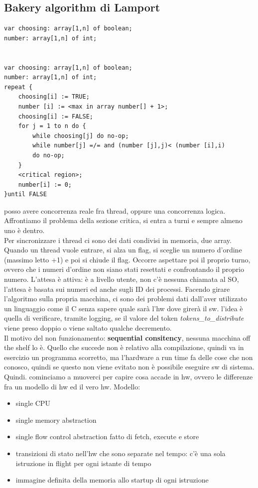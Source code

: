 \documentclass[14pt]{article}
\begin{document}
\subsection{Bakery algorithm di Lamport}
\begin{lstlisting}
var choosing: array[1,n] of boolean;
number: array[1,n] of int;


var choosing: array[1,n] of boolean;
number: array[1,n] of int;
repeat {
	choosing[i] := TRUE;
	number [i] := <max in array number[] + 1>;
	choosing[i] := FALSE;
	for j = 1 to n do {
		while choosing[j] do no-op;
		while number[j] =/= and (number [j],j)< (number [i],i)
		do no-op;
	}
	<critical region>;
	number[i] := 0;
}until FALSE
\end{lstlisting}
posso avere concorrenza reale fra thread, oppure una concorrenza logica. Affrontiamo il problema della sezione critica, si entra a turni e sempre almeno uno è dentro.\\ Per sincronizzare i thread ci sono dei dati condivisi in memoria, due array.\\ Quando un thread vuole entrare, si alza un flag, si sceglie un numero d'ordine (massimo letto +1) e poi si chiude il flag. Occorre aspettare poi il proprio turno, ovvero che i numeri d'ordine non siano stati resettati e confrontando il proprio numero. L'attesa è attiva: è a livello utente, non c'è nessuna chiamata al SO, l'attesa è basata sui numeri ed anche sugli ID dei processi. Facendo girare l'algoritmo sulla propria macchina, ci sono dei problemi dati dall'aver utilizzato un linguaggio come il C senza sapere quale sarà l'hw dove girerà il sw. l'idea è quella di verificare, tramite logging, se il valore del token \textit{tokens\_to\_distribute} viene preso doppio o viene saltato qualche decremento.\\ Il motivo del non funzionamento: \textbf{sequential consitency}, nessuna macchina off the shelf lo è. Quello che succede non è relativo alla compilazione, quindi va in esercizio un programma scorretto, ma l'hardware a run time fa delle cose che non conosco, quindi se questo non viene evitato non è possibile eseguire sw di sistema.\\ Quindi. cominciamo a muoverci per capire cosa accade in hw, ovvero le differenze fra un modello di hw ed il vero hw. Modello:
\begin{itemize}
\item single CPU
\item single memory abstraction
\item single flow control abstraction fatto di fetch, execute e store
\item transizioni di stato nell'hw che sono separate nel tempo: c'è una sola istruzione in flight per ogni istante di tempo
\item immagine definita della memoria allo startup di ogni istruzione
\end{itemize}
\end{document}
